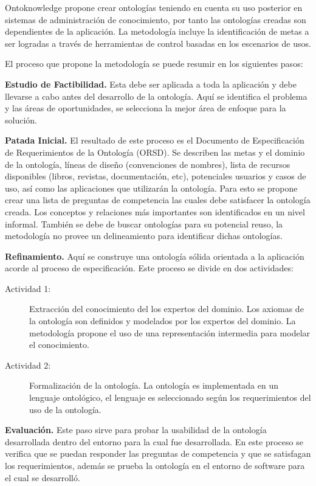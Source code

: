 Ontoknowledge\cite{On-to-knowledge} propone crear ontologías teniendo en cuenta su uso posterior en sistemas de administración de conocimiento, por tanto las ontologías creadas son dependientes de la aplicación. La metodología incluye la identificación de metas a ser logradas a través de herramientas de control basadas en los escenarios de usos.

El proceso que propone la metodología se puede resumir en los siguientes pasos:

\textbf{Estudio de Factibilidad.} Esta debe ser aplicada a toda la aplicación y debe llevarse a cabo antes del desarrollo de la ontología. Aquí se identifica el problema y las áreas de oportunidades, se selecciona la mejor área de enfoque para la solución.

\textbf{Patada Inicial.} El resultado de este proceso es el Documento de Especificación de Requerimientos de la Ontología (ORSD). Se describen las metas y el dominio de la ontología, líneas de diseño (convenciones de nombres), lista de recursos disponibles (libros, revistas, documentación, etc), potenciales usuarios y casos de uso, así como las aplicaciones que utilizarán la ontología. Para esto se propone crear una lista de preguntas de competencia las cuales debe satisfacer la ontología creada. Los conceptos y relaciones más importantes son identificados en un nivel informal. También se debe de buscar ontologías para su potencial reuso, la metodología no provee un delineamiento para identificar dichas ontologías.

\textbf{Refinamiento.} Aquí se construye una ontología sólida orientada a la aplicación acorde al proceso de especificación. Este proceso se divide en dos actividades:

\begin{description}
\item[Actividad 1:] Extracción del conocimiento del los expertos del dominio. Los axiomas de la ontología son definidos y modelados por los expertos del dominio. La metodología propone el uso de una representación intermedia para modelar el conocimiento.
\item[Actividad 2:] Formalización de la ontología. La ontología es implementada en un lenguaje ontológico, el lenguaje es seleccionado según los requerimientos del uso de la ontología.
\end{description}

\textbf{Evaluación.} Este paso sirve para probar la usabilidad de la ontología desarrollada dentro del entorno para la cual fue desarrollada. En este proceso se verifica que se puedan responder las preguntas de competencia y que se satisfagan los requerimientos, además se prueba la ontología en el entorno de software para el cual se desarrolló.

